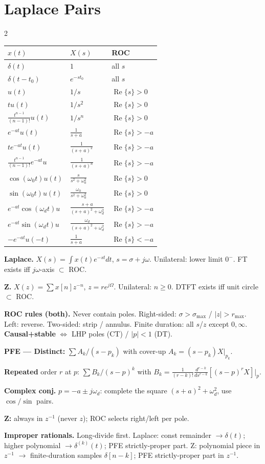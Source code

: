 \documentclass[11pt]{extarticle}
\renewcommand{\Re}{\operatorname{Re}}
\newcommand{\pairsection}[4]{%
  \needspace{2.8in}%
  \columnratio{#1}%
  \section*{#2}%
  \begin{paracol}{2}%
  #3%
  \switchcolumn%
  #4%
  \end{paracol}%
  \par\vspace{4pt}}
\begin{document}
\pairsection{0.38}{Laplace Pairs}{%
\begin{tabular}{@{}l l l@{}}
\toprule
$x(t)$ & $X(s)$ & ROC \\
\midrule
$\delta(t)$ & $1$ & all $s$ \\
$\delta(t{-}t_0)$ & $e^{-st_0}$ & all $s$ \\
$u(t)$ & $1/s$ & $\Re\{s\}{>}0$ \\
$tu(t)$ & $1/s^2$ & $\Re\{s\}{>}0$ \\
$\tfrac{t^{n-1}}{(n-1)!}u(t)$ & $1/s^n$ & $\Re\{s\}{>}0$ \\
$e^{-at}u(t)$ & $\tfrac{1}{s{+}a}$ & $\Re\{s\}{>}{-}a$ \\
$te^{-at}u(t)$ & $\tfrac{1}{(s{+}a)^2}$ & $\Re\{s\}{>}{-}a$ \\
$\tfrac{t^{n-1}}{(n-1)!}e^{-at}u$ & $\tfrac{1}{(s{+}a)^n}$ & $\Re\{s\}{>}{-}a$ \\
$\cos(\omega_0 t)u(t)$ & $\tfrac{s}{s^2{+}\omega_0^2}$ & $\Re\{s\}{>}0$ \\
$\sin(\omega_0 t)u(t)$ & $\tfrac{\omega_0}{s^2{+}\omega_0^2}$ & $\Re\{s\}{>}0$ \\
$e^{-at}\!\cos(\omega_d t)u$ & $\tfrac{s{+}a}{(s{+}a)^2{+}\omega_d^2}$ & $\Re\{s\}{>}{-}a$ \\
$e^{-at}\!\sin(\omega_d t)u$ & $\tfrac{\omega_d}{(s{+}a)^2{+}\omega_d^2}$ & $\Re\{s\}{>}{-}a$ \\
$-e^{-at}u(-t)$ & $\tfrac{1}{s{+}a}$ & $\Re\{s\}{<}{-}a$ \\
\bottomrule
\end{tabular}%
}{%
\textbf{Laplace.} $X(s)=\!\int x(t)e^{-st}dt$, $s=\sigma+j\omega$. Unilateral: lower limit $0^-$. FT exists iff $j\omega$-axis $\subset$ ROC.

\textbf{Z.} $X(z)=\!\sum x[n]z^{-n}$, $z=re^{j\Omega}$. Unilateral: $n\ge 0$. DTFT exists iff unit circle $\subset$ ROC.

\textbf{ROC rules (both).} Never contain poles. Right-sided: $\sigma>\sigma_{\max}$ / $|z|>r_{\max}$. Left: reverse. Two-sided: strip / annulus. Finite duration: all $s$/$z$ except $0,\infty$. \textbf{Causal+stable} $\Leftrightarrow$ LHP poles (CT) / $|p|<1$ (DT).

\textbf{PFE --- Distinct:} $\sum A_k/(s-p_k)$ with cover-up $A_k=(s-p_k)X|_{p_k}$.

\textbf{Repeated} order $r$ at $p$: $\sum B_k/(s-p)^k$ with $B_k=\tfrac{1}{(r-k)!}\tfrac{d^{r-k}}{ds^{r-k}}[(s-p)^r X]|_p$.

\textbf{Complex conj.} $p=-a\pm j\omega_d$: complete the square $(s+a)^2+\omega_d^2$, use $\cos/\sin$ pairs.

\textbf{Z:} always in $z^{-1}$ (never $z$); ROC selects right/left per pole.

\textbf{Improper rationals.} Long-divide first. Laplace: const remainder $\to\delta(t)$; higher polynomial $\to\delta^{(k)}(t)$; PFE strictly-proper part. Z: polynomial piece in $z^{-1}$ $\to$ finite-duration samples $\delta[n{-}k]$; PFE strictly-proper part in $z^{-1}$.%
}
\end{document}
